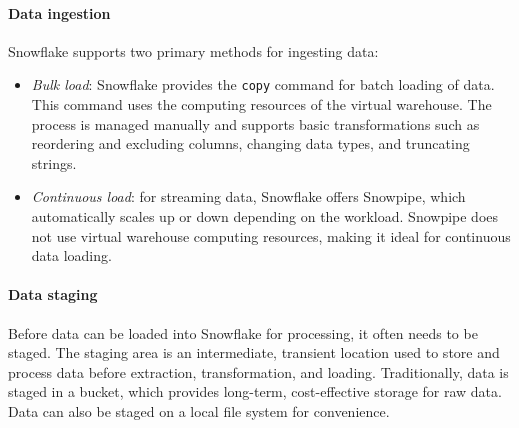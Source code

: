 \paragraph*{Data ingestion}
Snowflake supports two primary methods for ingesting data:
\begin{itemize}
    \item \textit{Bulk load}: Snowflake provides the \texttt{copy} command for batch loading of data. 
        This command uses the computing resources of the virtual warehouse. 
        The process is managed manually and supports basic transformations such as reordering and excluding columns, changing data types, and truncating strings.
    \item \textit{Continuous load}: for streaming data, Snowflake offers Snowpipe, which automatically scales up or down depending on the workload.
        Snowpipe does not use virtual warehouse computing resources, making it ideal for continuous data loading.
\end{itemize}

\paragraph*{Data staging}
Before data can be loaded into Snowflake for processing, it often needs to be staged. 
The staging area is an intermediate, transient location used to store and process data before extraction, transformation, and loading.
Traditionally, data is staged in a bucket, which provides long-term, cost-effective storage for raw data. Data can also be staged on a local file system for convenience.